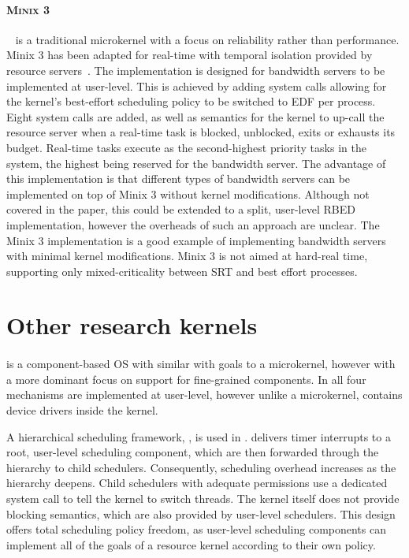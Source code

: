 \paragraph{\textsc{Minix 3}}~\citep{Herder_BGHT_06} is a traditional microkernel with a focus on
reliability rather than performance.  {\sc Minix 3} has been adapted for real-time with temporal
isolation provided by resource servers~\citep{Mancina_LFHGT_09}.  The implementation is designed for
bandwidth servers to be implemented at user-level.  This is achieved by adding system calls allowing
for the kernel's best-effort scheduling policy to be switched to \gls{EDF} per process.  Eight
system calls are added, as well as semantics for the kernel to up-call the resource server when a
real-time task is blocked, unblocked, exits or exhausts its budget.  Real-time tasks execute as the
second-highest priority tasks in the system, the highest being reserved for the bandwidth server.
The advantage of this implementation is that different types of bandwidth servers can be implemented
on top of {\sc Minix 3} without kernel modifications.  Although not covered in the paper, this could
be extended to a split, user-level \gls{RBED} implementation, however the overheads of such an
approach are unclear.  The {\sc Minix 3} implementation is a good example of implementing bandwidth
servers with minimal kernel modifications.  {\sc Minix 3} is not aimed at hard-real time, supporting
only mixed-criticality between \gls{SRT} and best effort processes.


\section{Other research kernels}

\paragraph{\composite} is a component-based \gls{OS} with similar with goals to a microkernel, however with a more dominant focus on support for fine-grained components.
In \composite all four mechanisms are implemented at user-level, however unlike a microkernel, \composite contains device drivers inside the kernel.

A hierarchical scheduling framework, \hires\citep{Parmer_West_11}, is used in \composite.
\hires delivers timer interrupts to a root, user-level scheduling component, which are then forwarded through the hierarchy to child schedulers.
Consequently, scheduling overhead increases as the hierarchy deepens.
Child schedulers with adequate permissions use a dedicated system call to tell the kernel to switch threads.
The kernel itself does not provide blocking semantics, which are also provided by user-level schedulers.
This design offers total scheduling policy freedom, as user-level scheduling components can implement all of the goals of a resource kernel according to their own policy.
 
